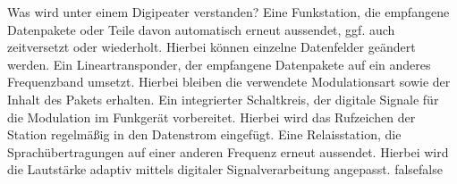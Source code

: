     {Was wird unter einem Digipeater verstanden?}
    {Eine Funkstation, die empfangene Datenpakete oder Teile davon automatisch erneut aussendet, ggf. auch zeitversetzt oder wiederholt. Hierbei können einzelne Datenfelder geändert werden.}
    {Ein Lineartransponder, der empfangene Datenpakete auf ein anderes Frequenzband umsetzt. Hierbei bleiben die verwendete Modulationsart sowie der Inhalt des Pakets erhalten.}
    {Ein integrierter Schaltkreis, der digitale Signale für die Modulation im Funkgerät vorbereitet. Hierbei wird das Rufzeichen der Station regelmäßig in den Datenstrom eingefügt.}
    {Eine Relaisstation, die Sprachübertragungen auf einer anderen Frequenz erneut aussendet. Hierbei wird die Lautstärke adaptiv mittels digitaler Signalverarbeitung angepasst.}
    {false}{false}